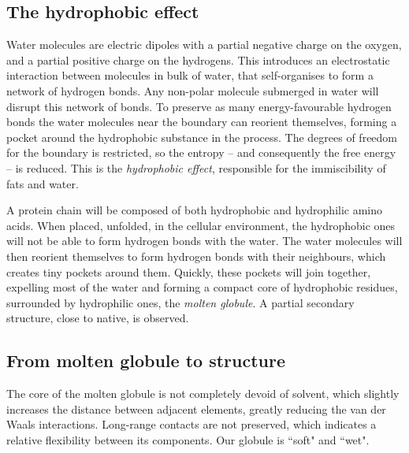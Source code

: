 
\subsection{The hydrophobic effect}
Water molecules are electric dipoles with a partial negative charge on the oxygen, and a partial positive charge on the hydrogens.
This introduces an electrostatic interaction between molecules in bulk of water, that self-organises to form a network of hydrogen bonds.
Any non-polar molecule submerged in water will disrupt this network of bonds.
To preserve as many energy-favourable hydrogen bonds the water molecules near the boundary can reorient themselves, forming a pocket around the hydrophobic substance in the process.
The degrees of freedom for the boundary is restricted, so the entropy -- and consequently the free energy -- is reduced.
This is the \emph{hydrophobic effect}, responsible for the immiscibility of fats and water.

A protein chain 
will be composed of both hydrophobic and hydrophilic amino acids.
When placed, unfolded, in the cellular environment, the hydrophobic ones will not be able to form hydrogen bonds with the water.
The water molecules will then reorient themselves to form hydrogen bonds with their neighbours, which creates tiny pockets around them.
Quickly, these pockets will join together, expelling most of the water and forming a compact core of hydrophobic residues, surrounded by hydrophilic ones, the \emph{molten globule}.
A partial secondary structure, close to native, is observed.

\subsection{From molten globule to structure}
The core of the molten globule is not completely devoid of solvent, which slightly increases the distance between adjacent elements, greatly reducing the van der Waals interactions.
Long-range contacts are not preserved, which indicates a relative flexibility between its components.
Our globule is ``soft" and ``wet".

